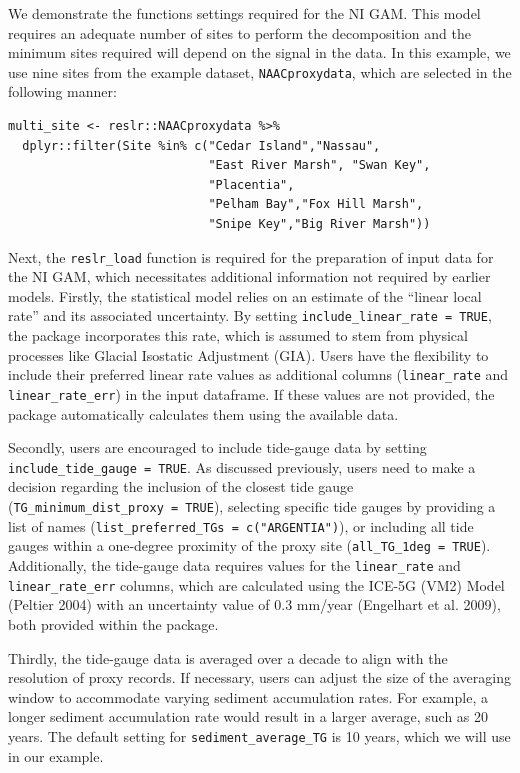 We demonstrate the functions settings required for the NI GAM. This model requires an adequate number of sites to perform the decomposition and the minimum sites required will depend on the signal in the data. In this example, we use nine sites from the example dataset, \texttt{NAACproxydata}, which are selected in the following manner:
\scriptsize

\begin{verbatim}
multi_site <- reslr::NAACproxydata %>% 
  dplyr::filter(Site %in% c("Cedar Island","Nassau",
                            "East River Marsh", "Swan Key",
                            "Placentia",
                            "Pelham Bay","Fox Hill Marsh",
                            "Snipe Key","Big River Marsh"))
\end{verbatim}

\normalsize

Next, the \texttt{reslr\_load} function is required for the preparation of input data for the NI GAM, which necessitates additional information not required by earlier models. Firstly, the statistical model relies on an estimate of the ``linear local rate'' and its associated uncertainty. By setting \texttt{include\_linear\_rate\ =\ TRUE}, the package incorporates this rate, which is assumed to stem from physical processes like Glacial Isostatic Adjustment (GIA). Users have the flexibility to include their preferred linear rate values as additional columns (\texttt{linear\_rate} and \texttt{linear\_rate\_err}) in the input dataframe. If these values are not provided, the package automatically calculates them using the available data.

Secondly, users are encouraged to include tide-gauge data by setting \texttt{include\_tide\_gauge\ =\ TRUE}. As discussed previously, users need to make a decision regarding the inclusion of the closest tide gauge (\texttt{TG\_minimum\_dist\_proxy\ =\ TRUE}), selecting specific tide gauges by providing a list of names (\texttt{list\_preferred\_TGs\ =\ c("ARGENTIA")}), or including all tide gauges within a one-degree proximity of the proxy site (\texttt{all\_TG\_1deg\ =\ TRUE}). Additionally, the tide-gauge data requires values for the \texttt{linear\_rate} and \texttt{linear\_rate\_err} columns, which are calculated using the ICE-5G (VM2) Model (Peltier 2004) with an uncertainty value of 0.3 mm/year (Engelhart et al. 2009), both provided within the  package.

Thirdly, the tide-gauge data is averaged over a decade to align with the resolution of proxy records. If necessary, users can adjust the size of the averaging window to accommodate varying sediment accumulation rates. For example, a longer sediment accumulation rate would result in a larger average, such as 20 years. The default setting for \texttt{sediment\_average\_TG} is 10 years, which we will use in our example.

